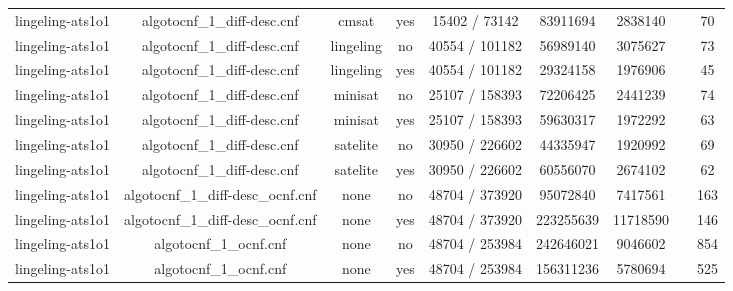 \begin{appendices}
\begin{table}[p]
\begin{center}
\begin{tabular}{l|cccccccc}
  lingeling-ats1o1               & algotocnf\_1\_diff-desc.cnf    & cmsat      & yes   & 15402 / 73142 & 83911694  & 2838140   &            & 70 \\ %
  lingeling-ats1o1               & algotocnf\_1\_diff-desc.cnf    & lingeling  & no    & 40554 / 101182 & 56989140  & 3075627   &            & 73 \\ %
  lingeling-ats1o1               & algotocnf\_1\_diff-desc.cnf    & lingeling  & yes   & 40554 / 101182 & 29324158  & 1976906   &            & 45 \\ %
  lingeling-ats1o1               & algotocnf\_1\_diff-desc.cnf    & minisat    & no    & 25107 / 158393 & 72206425  & 2441239   &            & 74 \\ %
  lingeling-ats1o1               & algotocnf\_1\_diff-desc.cnf    & minisat    & yes   & 25107 / 158393 & 59630317  & 1972292   &            & 63 \\ %
  lingeling-ats1o1               & algotocnf\_1\_diff-desc.cnf    & satelite   & no    & 30950 / 226602 & 44335947  & 1920992   &            & 69 \\ %
  lingeling-ats1o1               & algotocnf\_1\_diff-desc.cnf    & satelite   & yes   & 30950 / 226602 & 60556070  & 2674102   &            & 62 \\ %
  lingeling-ats1o1               & algotocnf\_1\_diff-desc\_ocnf.cnf & none       & no    & 48704 / 373920 & 95072840  & 7417561   &            & 163 \\ %
  lingeling-ats1o1               & algotocnf\_1\_diff-desc\_ocnf.cnf & none       & yes   & 48704 / 373920 & 223255639 & 11718590  &            & 146 \\ %
  lingeling-ats1o1               & algotocnf\_1\_ocnf.cnf         & none       & no    & 48704 / 253984 & 242646021 & 9046602   &            & 854 \\ %
  lingeling-ats1o1               & algotocnf\_1\_ocnf.cnf         & none       & yes   & 48704 / 253984 & 156311236 & 5780694   &            & 525 \\ %

\end{tabular}
\end{center}
\end{table}
\end{appendices}

